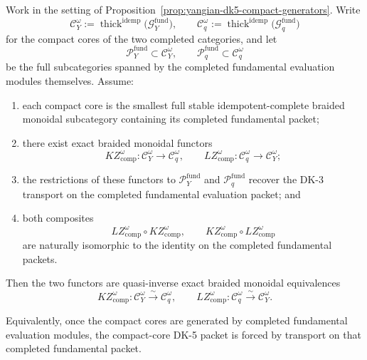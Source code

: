\begin{proposition}
\label{prop:yangian-dk5-fundamental-packet}
Work in the setting of
Proposition~\ref{prop:yangian-dk5-compact-generators}. Write
\[
\mathcal{C}_Y^\omega
:=
\operatorname{thick}^{\mathrm{idemp}}
\bigl(\mathcal{G}^{\mathrm{fund}}_{Y}\bigr),
\qquad
\mathcal{C}_q^\omega
:=
\operatorname{thick}^{\mathrm{idemp}}
\bigl(\mathcal{G}^{\mathrm{fund}}_{q}\bigr)
\]
for the compact cores of the two completed categories, and let
\[
\mathcal{P}^{\mathrm{fund}}_{Y}\subset \mathcal{C}_Y^\omega,
\qquad
\mathcal{P}^{\mathrm{fund}}_{q}\subset \mathcal{C}_q^\omega
\]
be the full subcategories spanned by the completed fundamental
evaluation modules themselves. Assume:
\begin{enumerate}[label=\textup{(\roman*)}]
\item each compact core is the smallest full stable
 idempotent-complete braided monoidal subcategory containing its
 completed fundamental packet;
\item there exist exact braided monoidal functors
 \[
 KZ^\omega_{\mathrm{comp}}\colon
 \mathcal{C}_Y^\omega \to \mathcal{C}_q^\omega,
 \qquad
 LZ^\omega_{\mathrm{comp}}\colon
 \mathcal{C}_q^\omega \to \mathcal{C}_Y^\omega;
 \]
\item the restrictions of these functors to
 $\mathcal{P}^{\mathrm{fund}}_{Y}$ and
 $\mathcal{P}^{\mathrm{fund}}_{q}$ recover the DK-3 transport on the
 completed fundamental evaluation packet; and
\item both composites
 \[
 LZ^\omega_{\mathrm{comp}} \circ KZ^\omega_{\mathrm{comp}},
 \qquad
 KZ^\omega_{\mathrm{comp}} \circ LZ^\omega_{\mathrm{comp}}
 \]
 are naturally isomorphic to the identity on the completed
 fundamental packets.
\end{enumerate}
Then the two functors are quasi-inverse exact braided monoidal
equivalences
\[
KZ^\omega_{\mathrm{comp}}\colon
\mathcal{C}_Y^\omega \xrightarrow{\sim} \mathcal{C}_q^\omega,
\qquad
LZ^\omega_{\mathrm{comp}}\colon
\mathcal{C}_q^\omega \xrightarrow{\sim} \mathcal{C}_Y^\omega.
\]

Equivalently, once the compact cores are generated by completed
fundamental evaluation modules, the compact-core DK-5 packet is forced
by transport on that completed fundamental packet.
\end{proposition}

